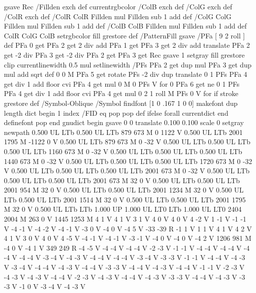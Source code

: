 {{{  gsave Rec
  /Fillden exch def
  currentrgbcolor
  /ColB exch def /ColG exch def /ColR exch def
  /ColR ColR Fillden mul Fillden sub 1 add def
  /ColG ColG Fillden mul Fillden sub 1 add def
  /ColB ColB Fillden mul Fillden sub 1 add def
  ColR ColG ColB setrgbcolor
  fill grestore } def
%
%
/PatternFill { gsave /PFa [ 9 2 roll ] def
    PFa 0 get PFa 2 get 2 div add PFa 1 get PFa 3 get 2 div add translate
    PFa 2 get -2 div PFa 3 get -2 div PFa 2 get PFa 3 get Rec
    gsave 1 setgray fill grestore clip
    currentlinewidth 0.5 mul setlinewidth
    /PFs PFa 2 get dup mul PFa 3 get dup mul add sqrt def
    0 0 M PFa 5 get rotate PFs -2 div dup translate
	0 1 PFs PFa 4 get div 1 add floor cvi
	{ PFa 4 get mul 0 M 0 PFs V } for
    0 PFa 6 get ne {
	0 1 PFs PFa 4 get div 1 add floor cvi
	{ PFa 4 get mul 0 2 1 roll M PFs 0 V } for
    } if
    stroke grestore } def
%
/Symbol-Oblique /Symbol findfont [1 0 .167 1 0 0] makefont
dup length dict begin {1 index /FID eq {pop pop} {def} ifelse} forall
currentdict end definefont pop
end
gnudict begin
gsave
0 0 translate
0.100 0.100 scale
0 setgray
newpath
0.500 UL
LTb
0.500 UL
LTb
879 673 M
0 1122 V
0.500 UL
LTb
2001 1795 M
-1122 0 V
0.500 UL
LTb
879 673 M
0 -32 V
0.500 UL
LTb
0.500 UL
LTb
0.500 UL
LTb
1160 673 M
0 -32 V
0.500 UL
LTb
0.500 UL
LTb
0.500 UL
LTb
1440 673 M
0 -32 V
0.500 UL
LTb
0.500 UL
LTb
0.500 UL
LTb
1720 673 M
0 -32 V
0.500 UL
LTb
0.500 UL
LTb
0.500 UL
LTb
2001 673 M
0 -32 V
0.500 UL
LTb
0.500 UL
LTb
0.500 UL
LTb
2001 673 M
32 0 V
0.500 UL
LTb
0.500 UL
LTb
2001 954 M
32 0 V
0.500 UL
LTb
0.500 UL
LTb
2001 1234 M
32 0 V
0.500 UL
LTb
0.500 UL
LTb
2001 1514 M
32 0 V
0.500 UL
LTb
0.500 UL
LTb
2001 1795 M
32 0 V
0.500 UL
LTb
LTb
1.000 UP
1.000 UL
LT0
LTb
1.000 UL
LT0
2404 2004 M
263 0 V
1445 1253 M
4 1 V
4 1 V
3 1 V
4 0 V
4 0 V
4 -2 V
1 -1 V
-1 -1 V
-4 -1 V
-4 -2 V
-4 -1 V
-3 0 V
-4 0 V
-4 5 V
-33 -39 R
-1 1 V
1 1 V
4 1 V
4 2 V
4 1 V
3 0 V
4 0 V
4 -5 V
-4 -1 V
-4 -1 V
-3 -1 V
-4 0 V
-4 0 V
-4 2 V
1206 981 M
-4 0 V
-4 1 V
349 249 R
-4 -5 V
-4 -4 V
-4 -4 V
-2 -3 V
-1 -1 V
-4 -4 V
-4 -4 V
-4 -4 V
-4 -4 V
-3 -4 V
-4 -3 V
-4 -4 V
-4 -4 V
-3 -4 V
-3 -3 V
-1 -1 V
-4 -4 V
-4 -3 V
-3 -4 V
-4 -4 V
-4 -3 V
-4 -4 V
-3 -3 V
-4 -4 V
-4 -3 V
-4 -4 V
-1 -1 V
-2 -3 V
-4 -3 V
-4 -3 V
-4 -4 V
-2 -3 V
-4 -3 V
-4 -4 V
-4 -3 V
-3 -3 V
-4 -4 V
-4 -3 V
-3 -3 V
-1 0 V
-3 -4 V
-4 -3 V
}}
